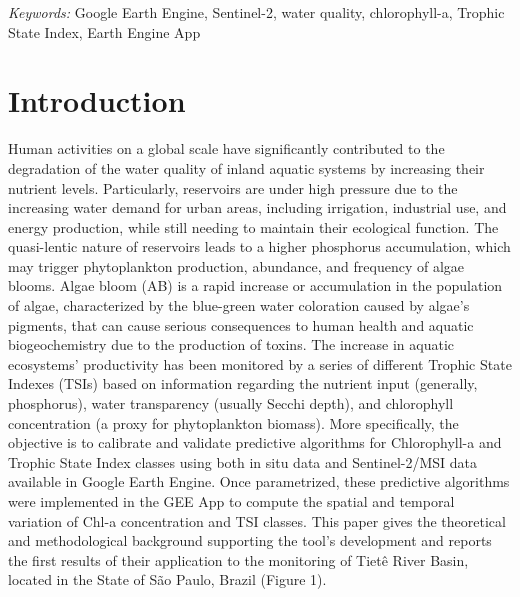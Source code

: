 \documentclass[
  12pt]{article}
\begin{document}
\noindent%
{\it Keywords:} Google Earth Engine, Sentinel-2, water
quality, chlorophyll-a, Trophic State Index, Earth Engine App
\vfill

\newpage
{} %
\ifdefined\Shaded\renewenvironment{Shaded}{\begin{tcolorbox}[borderline west={3pt}{0pt}{shadecolor}, interior hidden, boxrule=0pt, frame hidden, enhanced, breakable, sharp corners]}{\end{tcolorbox}}\fi

\hypertarget{sec-intro}{%
\section{Introduction}\label{sec-intro}}

Human activities on a global scale have significantly contributed to the
degradation of the water quality of inland aquatic systems by increasing
their nutrient levels. Particularly, reservoirs are under high pressure
due to the increasing water demand for urban areas, including
irrigation, industrial use, and energy production, while still needing
to maintain their ecological function. The quasi-lentic nature of
reservoirs leads to a higher phosphorus accumulation, which may trigger
phytoplankton production, abundance, and frequency of algae blooms.
Algae bloom (AB) is a rapid increase or accumulation in the population
of algae, characterized by the blue-green water coloration caused by
algae's pigments, that can cause serious consequences to human health
and aquatic biogeochemistry due to the production of toxins. The
increase in aquatic ecosystems' productivity has been monitored by a
series of different Trophic State Indexes (TSIs) based on information
regarding the nutrient input (generally, phosphorus), water transparency
(usually Secchi depth), and chlorophyll concentration (a proxy for
phytoplankton biomass). More specifically, the objective is to calibrate
and validate predictive algorithms for Chlorophyll-a and Trophic State
Index classes using both in situ data and Sentinel-2/MSI data available
in Google Earth Engine. Once parametrized, these predictive algorithms
were implemented in the GEE App to compute the spatial and temporal
variation of Chl-a concentration and TSI classes. This paper gives the
theoretical and methodological background supporting the tool's
development and reports the first results of their application to the
monitoring of Tietê River Basin, located in the State of São Paulo,
Brazil (Figure 1).
\end{document}
